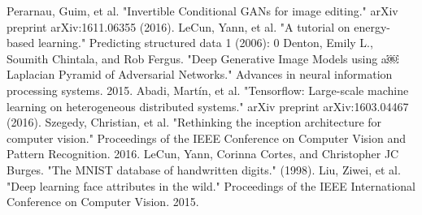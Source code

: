 \documentclass[9pt]{article}
\begin{document}
\noindent [13] Perarnau, Guim, et al. "Invertible Conditional GANs for image editing." arXiv preprint arXiv:1611.06355 (2016). \newline
\noindent [14] LeCun, Yann, et al. "A tutorial on energy-based learning." Predicting structured data 1 (2006): 0 \newline
\noindent [15] Denton, Emily L., Soumith Chintala, and Rob Fergus. "Deep Generative Image Models using a￼ Laplacian Pyramid of Adversarial Networks." Advances in neural information processing systems. 2015. \newline
\noindent [16] Abadi, Martín, et al. "Tensorflow: Large-scale machine learning on heterogeneous distributed systems." arXiv preprint arXiv:1603.04467 (2016). \newline
\noindent [17] Szegedy, Christian, et al. "Rethinking the inception architecture for computer vision." Proceedings of the IEEE Conference on Computer Vision and Pattern Recognition. 2016. \newline
\noindent [18] LeCun, Yann, Corinna Cortes, and Christopher JC Burges. "The MNIST database of handwritten digits." (1998). \newline
\noindent [19] Liu, Ziwei, et al. "Deep learning face attributes in the wild." Proceedings of the IEEE International Conference on Computer Vision. 2015. \newline



\appendix
\end{document}
